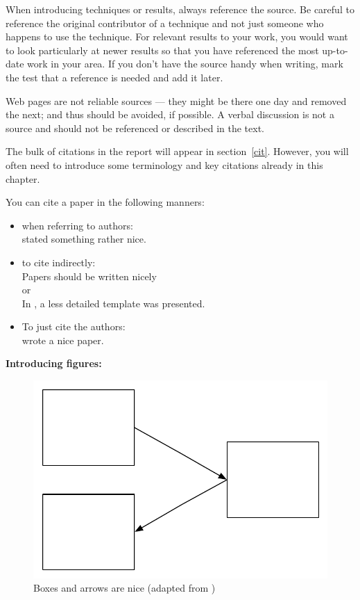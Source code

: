 When introducing techniques or results, always reference the source. Be careful to reference the original contributor of a technique and not just someone who happens to use the technique. For relevant results to your work, you would want to look particularly at newer results so that you have referenced the most up-to-date work in your area. If you don't have the source handy when writing, mark the test that a reference is needed and add it later. 

Web pages are not reliable sources --- they might be there one day and removed the next; and thus should be avoided, if possible. A verbal discussion is not a source and should not be referenced or described in the text.  

The bulk of citations in the report will appear in section~\ref{cit}. However, you will often need to introduce some terminology and key citations already in this chapter. 

You can cite a paper in the following manners: 

\begin{itemize}
\item when referring to authors:\\
 \citet{authorson10:_secon_best_paper_in_world} stated something rather nice.
\item to cite indirectly: \\
 Papers should be written nicely \citep{authorson10:_secon_best_paper_in_world}\\
or\\
In \cite{authorson10:_secon_best_paper_in_world}, a less detailed template was presented.
\item To just cite the authors: \\
\citeauthor{authorson10:_secon_best_paper_in_world} wrote a nice paper.
\end{itemize}

\vspace{0.5cm}

\noindent
{\bf Introducing figures:} \\

\begin{figure}[ht]
\begin{center}
\includegraphics[width=0.5\columnwidth]{figs/figure1.pdf}
\caption[Boxes and arrows are nice]{Boxes and arrows are nice (adapted from \citet{authorson10:_secon_best_paper_in_world})}
\label{fig:BoxesAndArrowsAreNice}
\end{center}
\end{figure}

